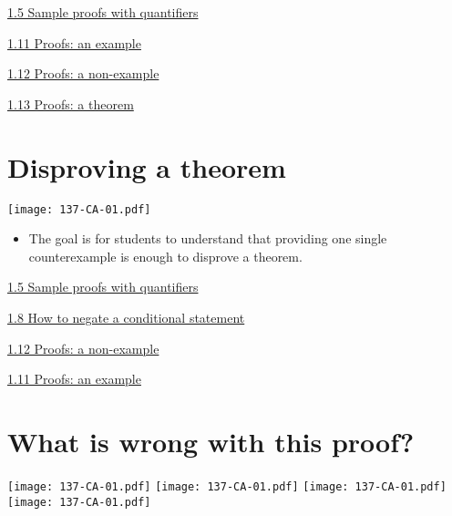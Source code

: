 \documentclass[11pt]{article}
\newcommand{\n}{\newpage}
\newcommand{\nl}{\hfill \vspace{-1.1\baselineskip}} %
\newcommand{\vfive}{\hspace{8mm}\href{https://www.youtube.com/watch?v=4UwhnYJVi0o&list=PLlwePzQY_wW-CPzhk-af-MXj9knthD1gx&index=5}{1.5 Sample proofs with quantifiers}}
\newcommand{\veight}{\hspace{8mm}\href{https://www.youtube.com/watch?v=PfAr1hhhL9o&list=PLlwePzQY_wW-CPzhk-af-MXj9knthD1gx&index=8}{1.8 How to negate a conditional statement}}
\newcommand{\vten}{\hspace{8mm}\href{https://www.youtube.com/watch?v=IBwDUEXM0xs&list=PLlwePzQY_wW-CPzhk-af-MXj9knthD1gx&index=10}{1.10 How to write a rigorous mathematical definition}}
\newcommand{\veleven}{\hspace{8mm}\href{https://www.youtube.com/watch?v=9rYcAygjOas&list=PLlwePzQY_wW-CPzhk-af-MXj9knthD1gx&index=11}{1.11 Proofs: an example}}
\newcommand{\vtwelve}{\hspace{8mm}\href{https://www.youtube.com/watch?v=a0_dQgwuzYk&list=PLlwePzQY_wW-CPzhk-af-MXj9knthD1gx&index=12}{1.12 Proofs: a non-example}}
\newcommand{\vthirteen}{\hspace{8mm}\href{https://www.youtube.com/watch?v=x0d3gO1e868&list=PLlwePzQY_wW-CPzhk-af-MXj9knthD1gx&index=13}{1.13 Proofs: a theorem}}
\begin{document}
\begin{videos}

\vfive

\veleven

\vtwelve

\vthirteen
\end{videos}

\n

\newpage
\section{Disproving a theorem} 

\begin{center}
{ \texttt{[image: 137-CA-01.pdf]}}
\end{center}

\begin{comments}
\nl
	\begin{itemize}
	  \item The goal is for students to understand that providing one single counterexample is enough to disprove a theorem.
  	\end{itemize}
\end{comments}

\begin{videos}
\vfive

\veight

\vtwelve

\veleven
\end{videos}

\n
\newpage
\section{What is wrong with this proof?} 

\begin{center}
{ \texttt{[image: 137-CA-01.pdf]}}
\quad
{ \texttt{[image: 137-CA-01.pdf]}}
{ \texttt{[image: 137-CA-01.pdf]}}
\quad
{ \texttt{[image: 137-CA-01.pdf]}}
\end{center}
\end{document}
